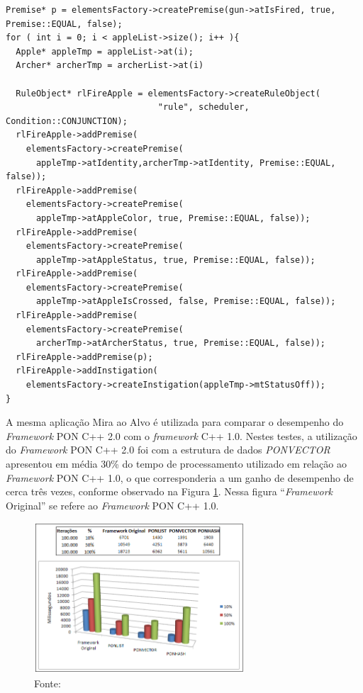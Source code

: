 \begin{lstlisting}[caption = {Exemplo de programa com o \textit{framework} C++ 2.0},
source = {Adaptado de \citeonline{msc_valenca_2012}},
  label = {cod:fw2_ex}, float=htb]
Premise* p = elementsFactory->createPremise(gun->atIsFired, true, Premise::EQUAL, false);
for ( int i = 0; i < appleList->size(); i++ ){
  Apple* appleTmp = appleList->at(i);
  Archer* archerTmp = archerList->at(i)

  RuleObject* rlFireApple = elementsFactory->createRuleObject(
                              "rule", scheduler, Condition::CONJUNCTION);
  rlFireApple->addPremise(
    elementsFactory->createPremise(
      appleTmp->atIdentity,archerTmp->atIdentity, Premise::EQUAL, false));
  rlFireApple->addPremise(
    elementsFactory->createPremise(
      appleTmp->atAppleColor, true, Premise::EQUAL, false));
  rlFireApple->addPremise(
    elementsFactory->createPremise(
      appleTmp->atAppleStatus, true, Premise::EQUAL, false));
  rlFireApple->addPremise(
    elementsFactory->createPremise(
      appleTmp->atAppleIsCrossed, false, Premise::EQUAL, false));
  rlFireApple->addPremise(
    elementsFactory->createPremise(
      archerTmp->atArcherStatus, true, Premise::EQUAL, false));
  rlFireApple->addPremise(p);
  rlFireApple->addInstigation(
    elementsFactory->createInstigation(appleTmp->mtStatusOff));
}
\end{lstlisting}

A mesma aplicação Mira ao Alvo é utilizada para comparar o desempenho do
\textit{Framework} PON C++ 2.0 com o \textit{framework} C++ 1.0. Nestes testes, a
utilização do \textit{Framework} PON C++ 2.0 foi com a estrutura de dados
\textit{PONVECTOR} apresentou em média 30\% do tempo de processamento utilizado
em relação ao \textit{Framework} PON C++ 1.0, o que corresponderia a um ganho de
desempenho de cerca três vezes, conforme observado na Figura
\ref{fig:fw2_vs_fw1}. Nessa figura \enquote{\textit{Framework} Original} se refere  ao
\textit{Framework} PON C++ 1.0.

\begin{figure}[!htb]
  \centering
  \caption{Comparação do desempenho do \textit{Framework} PON C++ 2.0 com o
  \textit{Framework} PON C++ 1.0}
  \includegraphics[width=0.7\textwidth]{../figures/fw2_vs_fw1.png}
  \caption*{Fonte: }
  \label{fig:fw2_vs_fw1}
\end{figure}

